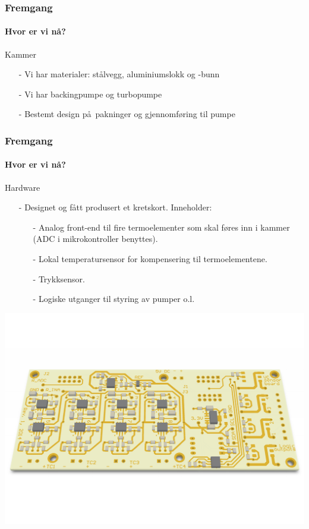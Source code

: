 \documentclass{beamer}
\begin{document}
  \begin{frame}
    \frametitle{Fremgang}
    \framesubtitle{Hvor er vi n\aa ?}
    \begin{block}{Kammer}
    	\begin{itemize}
    		\item[-] Vi har materialer: st\aa lvegg, aluminiumslokk og -bunn
    		\item[-] Vi har backingpumpe og turbopumpe
    		\item[-] Bestemt design p\aa\ pakninger og gjennomf\o ring til pumpe
    	\end{itemize}
    \end{block}
    \end{frame}
    
    \begin{frame}
    	\frametitle{Fremgang}
    	\framesubtitle{Hvor er vi n\aa ?}
    	\begin{block}{Hardware}
    		\begin{itemize}
    			\item[-] Designet og fått produsert et kretskort. Inneholder:
					\begin{itemize}
					\item[-] Analog front-end til fire termoelementer som skal føres inn i kammer (ADC i mikrokontroller benyttes).
					\item[-] Lokal temperatursensor for kompensering til termoelementene.
					\item[-] Trykksensor.
					\item[-] Logiske utganger til styring av pumper o.l.
					\end{itemize}
    		\end{itemize}
    	\end{block}
			\includegraphics[width=\textwidth]{kretskort.pdf}
    \end{frame}
    
\end{document}

